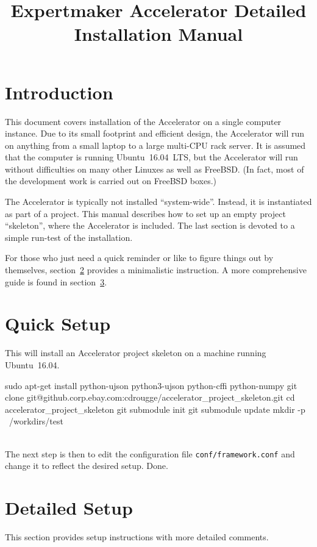 \documentclass[a4paper]{article}
\title{\vspace{-0.5cm}Expertmaker Accelerator Detailed Installation Manual\vspace{-0.5cm}}
\date{}
\begin{document}
\maketitle

\section{Introduction}

This document covers installation of the Accelerator on a single
computer instance.  Due to its small footprint and efficient design,
the Accelerator will run on anything from a small laptop to a large
multi-CPU rack server.  It is assumed that the computer is running
Ubuntu~16.04~LTS, but the Accelerator will run without difficulties on
many other Linuxes as well as FreeBSD.  (In fact, most of the
development work is carried out on FreeBSD boxes.)

The Accelerator is typically not installed ``system-wide''.  Instead,
it is instantiated as part of a project.  This manual describes how to
set up an empty project ``skeleton'', where the Accelerator is
included.  The last section is devoted to a simple run-test of the
installation.

For those who just need a quick reminder or like to figure things out
by themselves, section~\ref{sec:quick} provides a minimalistic
instruction.  A more comprehensive guide is found in
section~\ref{sec:holdhand}.



\section{Quick Setup}
\label{sec:quick}
This will install an Accelerator project skeleton on a machine running
Ubuntu~16.04.
\\
\begin{shell}
  sudo apt-get install python-ujson python3-ujson python-cffi python-numpy
  git clone git@github.corp.ebay.com:cdrougge/accelerator_project_skeleton.git
  cd accelerator_project_skeleton
  git submodule init
  git submodule update
  mkdir -p ~/workdirs/test
\end{shell}
\\ The next step is then to edit the configuration file
\texttt{conf/framework.conf} and change it to reflect the desired
setup.  Done.



\section{Detailed Setup}
\label{sec:holdhand}
This section provides setup instructions with more detailed comments.
\end{document}
